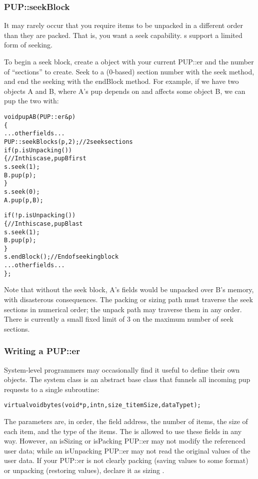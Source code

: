 \subsubsection{PUP::seekBlock}
It may rarely occur that you require items to be unpacked
in a different order than they are packed.  That is, you
want a seek capability.  s support a limited 
form of seeking.

To begin a seek block, create a  object
with your current PUP::er and the number of ``sections'' to 
create.  Seek to a (0-based) section number
with the seek method, and end the seeking with the endBlock method.
For example, if we have two objects A and B, where A's pup
depends on and affects some object B, we can pup the two with:

\begin{alltt}
void pupAB(PUP::er &p)
\{
  ... other fields ...
  PUP::seekBlock s(p,2); //2 seek sections
  if (p.isUnpacking()) 
  \{//In this case, pup B first
    s.seek(1);
    B.pup(p);
  \}
  s.seek(0);
  A.pup(p,B);
  
  if (!p.isUnpacking()) 
  \{//In this case, pup B last
    s.seek(1);
    B.pup(p);
  \}
  s.endBlock(); //End of seeking block
  ... other fields ...
\};
\end{alltt}

Note that without the seek block, A's fields would be unpacked
over B's memory, with disasterous consequences.
The packing or sizing path must traverse the seek sections
in numerical order; the unpack path may traverse them in any
order.  There is currently a small fixed limit of 3 on the 
maximum number of seek sections.


\subsubsection{Writing a PUP::er}
System-level programmers may occasionally find it useful to define
their own  objects.  The system  class is 
an abstract base class that funnels all incoming pup requests
to a single subroutine:

\begin{alltt}
    virtual void bytes(void *p,int n,size\_t itemSize,dataType t);
\end{alltt}

The parameters are, in order, the field address, the number of items,
the size of each item, and the type of the items. The 
is allowed to use these fields in any way.  However, an isSizing
or isPacking PUP::er may not modify the referenced user data; 
while an isUnpacking PUP::er may not read the original values of 
the user data.  If your PUP::er is not clearly packing (saving values
to some format) or unpacking (restoring values), declare it as 
sizing .



